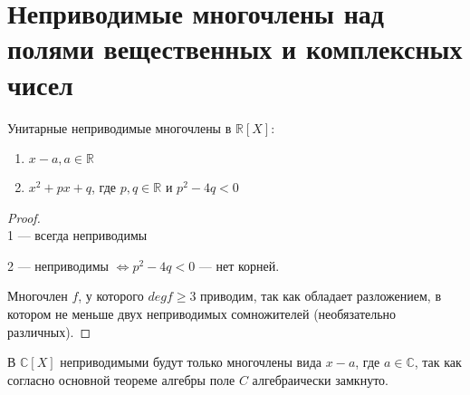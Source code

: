 \section{Неприводимые многочлены над полями вещественных и комплексных чисел}

\begin{theorem-non}
    Унитарные неприводимые многочлены в $\mathbb{R}[X]:$
    \begin{enumerate}
        \item $x - a, a \in \mathbb{R}$
        \item $x^2 + px + q$, где $p,q \in \mathbb{R}$ и $p^2 - 4q < 0$
    \end{enumerate}

    \begin{proof} $ $ \\
        1 --- всегда неприводимы

        2 --- неприводимы
        $\Longleftrightarrow p^2 - 4q < 0$ --- нет корней. 
        
        Многочлен $f$, у которого $deg f \geqslant 3$ приводим, так как обладает разложением, 
        в котором не меньше двух неприводимых сомножителей (необязательно различных).
    \end{proof}
\end{theorem-non}

В $\mathbb{C}[X]$ неприводимыми будут только многочлены вида $x - a$, где $a \in \mathbb{C}$,
так как согласно основной теореме алгебры поле $C$ алгебраически замкнуто. 